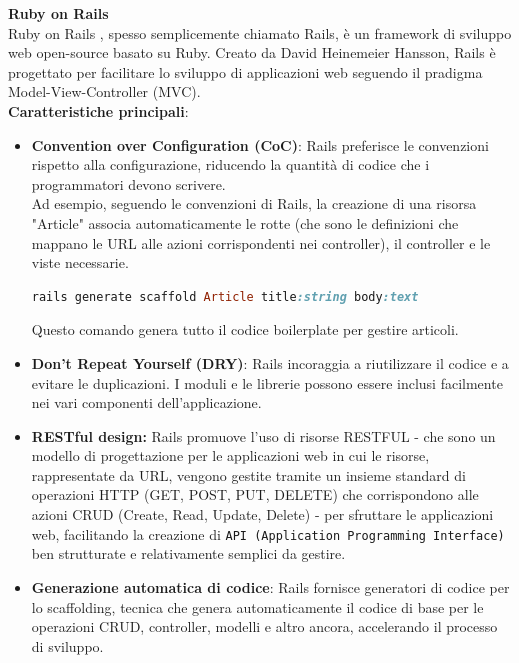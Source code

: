 \documentclass[a4paper, 12pt]{book}
\begin{document}
{\Large\textbf{Ruby on Rails}}\\

Ruby on Rails \cite{Rails}, spesso semplicemente chiamato Rails, è un framework di sviluppo web open-source basato su Ruby. Creato da David Heinemeier Hansson, Rails
è progettato per facilitare lo sviluppo di applicazioni web seguendo il pradigma Model-View-Controller (MVC).\\

\textbf{Caratteristiche principali}:

\begin{itemize}
  \item \textbf{Convention over Configuration (CoC)}: Rails preferisce le convenzioni rispetto alla configurazione, riducendo la quantità di codice che i
        programmatori devono scrivere.\\
        Ad esempio, seguendo le convenzioni di Rails, la creazione di una risorsa "Article" associa automaticamente le rotte (che sono le definizioni che mappano le URL alle azioni
        corrispondenti nei controller), il controller e le viste necessarie.\\
        \begin{lstlisting}[language=ruby]
          rails generate scaffold Article title:string body:text
        \end{lstlisting}
        Questo comando genera tutto il codice boilerplate per gestire articoli.
  \item \textbf{Don't Repeat Yourself (DRY)}: Rails incoraggia a riutilizzare il codice e a evitare le duplicazioni.
        I moduli e le librerie possono essere inclusi facilmente nei vari componenti dell'applicazione.
  \item \textbf{RESTful design:} Rails promuove l'uso di risorse RESTFUL - che sono un modello di progettazione per le applicazioni web in cui le risorse, rappresentate da URL,
        vengono gestite tramite un insieme standard di operazioni HTTP (GET, POST, PUT, DELETE) che corrispondono alle azioni CRUD (Create, Read, Update, Delete) - per
        sfruttare le applicazioni web, facilitando la creazione di \texttt{API (Application Programming Interface)} ben strutturate e relativamente semplici da gestire.
  \item \textbf{Generazione automatica di codice}: Rails fornisce generatori di codice per lo scaffolding, tecnica che genera automaticamente il codice di base per le
        operazioni CRUD, controller, modelli e altro ancora, accelerando il processo di sviluppo.\\
\end{itemize}
\end{document}
